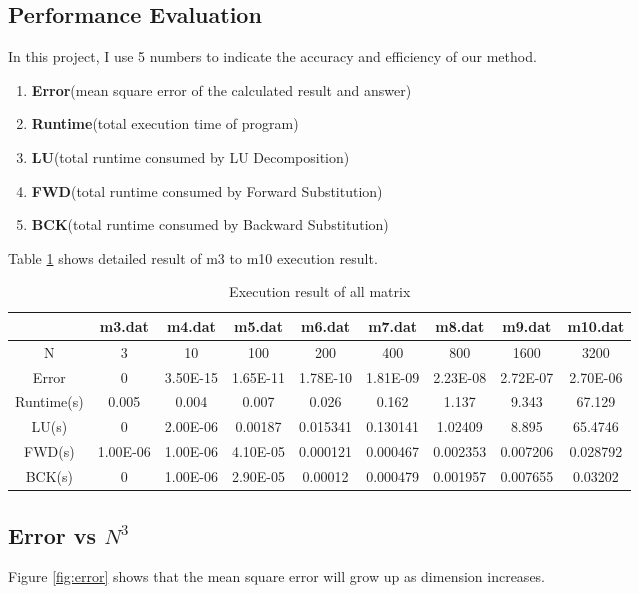 \documentclass{article}
\begin{document}
\subsection{Performance Evaluation}
In this project, I use 5 numbers to indicate the accuracy and efficiency of our method.
\begin{enumerate}
    \item \textbf{Error}(mean square error of the calculated result and answer)
    \item \textbf{Runtime}(total execution time of program)
    \item \textbf{LU}(total runtime consumed by LU Decomposition)
    \item \textbf{FWD}(total runtime consumed by Forward Substitution)
    \item \textbf{BCK}(total runtime consumed by Backward Substitution)
\end{enumerate}
Table \ref{tab:record} shows detailed result of m3 to m10 execution result.
\begin{table}[htbp]
  \centering
  \caption{Execution result of all matrix}
    \begin{tabular}{|c|c|c|c|c|c|c|c|c|}
    \hline
        & m3.dat & m4.dat & m5.dat & m6.dat & m7.dat & m8.dat & m9.dat & m10.dat \bigstrut\\
    \hline
    N   & 3   & 10  & 100 & 200 & 400 & 800 & 1600 & 3200 \bigstrut\\
    \hline
    Error & 0   & 3.50E-15 & 1.65E-11 & 1.78E-10 & 1.81E-09 & 2.23E-08 & 2.72E-07 & 2.70E-06 \bigstrut\\
    \hline
    Runtime(s) & 0.005 & 0.004 & 0.007 & 0.026 & 0.162 & 1.137 & 9.343 & 67.129 \bigstrut\\
    \hline
    LU(s) & 0   & 2.00E-06 & 0.00187 & 0.015341 & 0.130141 & 1.02409 & 8.895 & 65.4746 \bigstrut\\
    \hline
    FWD(s) & 1.00E-06 & 1.00E-06 & 4.10E-05 & 0.000121 & 0.000467 & 0.002353 & 0.007206 & 0.028792 \bigstrut\\
    \hline
    BCK(s) & 0   & 1.00E-06 & 2.90E-05 & 0.00012 & 0.000479 & 0.001957 & 0.007655 & 0.03202 \bigstrut\\
    \hline
    \end{tabular}%
  \label{tab:record}%
\end{table}%

\subsection{Error vs $N^3$}
Figure \ref{fig:error} shows that the mean square error will grow up as dimension increases.
\end{document}
